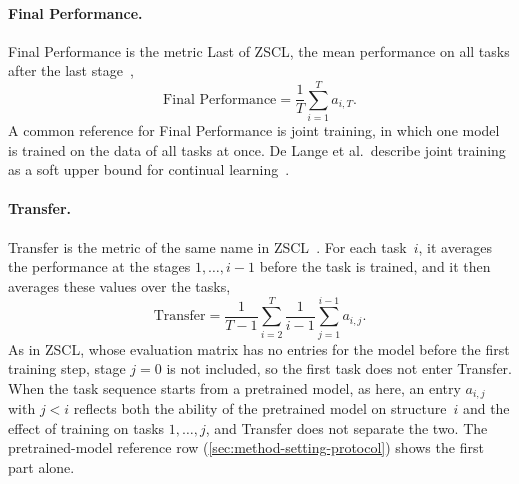 \paragraph{Final Performance.}
Final Performance is the metric Last of ZSCL, the mean performance on all tasks after the last stage~\cite[Sec.~4, Fig.~4b]{zheng2023preventingzeroshottransferdegradation},
\begin{equation}
\text{Final Performance} = \frac{1}{T} \sum_{i=1}^{T} a_{i,T}.
\label{eq:bg-final}
\end{equation}
A common reference for Final Performance is joint training, in which one model is trained on the data of all tasks at once.
De Lange et al.\ describe joint training as a soft upper bound for continual learning~\cite[Sec.~5]{delange2022}.

\paragraph{Transfer.}
Transfer is the metric of the same name in ZSCL~\cite[Sec.~4, Fig.~4b]{zheng2023preventingzeroshottransferdegradation}.
For each task~$i$, it averages the performance at the stages $1, \dots, i-1$ before the task is trained, and it then averages these values over the tasks,
\begin{equation}
\text{Transfer} = \frac{1}{T-1} \sum_{i=2}^{T} \frac{1}{i-1} \sum_{j=1}^{i-1} a_{i,j}.
\label{eq:bg-transfer}
\end{equation}
As in ZSCL, whose evaluation matrix has no entries for the model before the first training step, stage $j = 0$ is not included, so the first task does not enter Transfer.
When the task sequence starts from a pretrained model, as here, an entry $a_{i,j}$ with $j < i$ reflects both the ability of the pretrained model on structure~$i$ and the effect of training on tasks $1, \dots, j$, and Transfer does not separate the two.
The pretrained-model reference row (\cref{sec:method-setting-protocol}) shows the first part alone.


